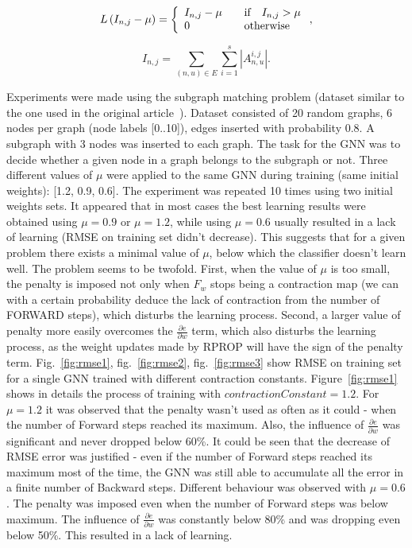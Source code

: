 \documentclass[a4paper, 11pt, twocolumn]{spie}  %
\begin{document}
\begin{equation}
L\left(I_{n,j} - \mu\right) = \left\{
	\begin{array}{l l}
		I_{n,j} - \mu & \quad \text{if} \quad I_{n,j} > \mu \\
		0 & \quad \text{otherwise}
	\end{array} \right. ,
\label{eq:contraction}
\end{equation}

\begin{equation}
I_{n,j} = \sum_{(n, u) \in E} \sum_{i=1}^{s}|A_{n,u}^{i,j}|.
\end{equation}

Experiments were made using the subgraph matching problem (dataset similar to the one used in the original article~\cite{scarselli2009graph}). Dataset consisted of 20 random graphs, 6 nodes per graph (node labels [0..10]), edges inserted with probability 0.8. A subgraph with 3 nodes was inserted to each graph. The task for the GNN was to decide whether a given node in a graph belongs to the subgraph or not. Three different values of $\mu$ were applied to the same GNN during training (same initial weights): [1.2, 0.9, 0.6]. The experiment was repeated 10 times using two initial weights sets. It appeared that in most cases the best learning results were obtained using $\mu = 0.9$ or $\mu = 1.2$, while using $\mu = 0.6$ usually resulted in a lack of learning (RMSE on training set didn't decrease). This suggests that for a given problem there exists a minimal value of $\mu$, below which the classifier doesn't learn well. The problem seems to be twofold. First, when the value of $\mu$ is too small, the penalty is imposed not only when $F_w$ stops being a contraction map (we can with a certain probability deduce the lack of contraction from the number of FORWARD steps), which disturbs the learning process. Second, a larger value of penalty more easily overcomes the $\frac{\partial e}{\partial w}$ term, which also disturbs the learning process, as the weight updates made by RPROP will have the sign of the penalty term. Fig.~\ref{fig:rmse1}, fig.~\ref{fig:rmse2}, fig.~\ref{fig:rmse3} show RMSE on training set for a single GNN trained with different contraction constants. Figure~\ref{fig:rmse1} shows in details the process of training with $contractionConstant = 1.2$. For $\mu = 1.2$ it was observed that the penalty wasn't used as often as it could - when the number of Forward steps reached its maximum. Also, the influence of $\frac{\partial e}{\partial w}$ was significant and never dropped below 60\%. It could be seen that the decrease of RMSE error was justified - even if the number of Forward steps reached its maximum most of the time, the GNN was still able to accumulate all the error in a finite number of Backward steps. Different behaviour was observed with $\mu = 0.6$. The penalty was imposed even when the number of Forward steps was below maximum. The influence of $\frac{\partial e}{\partial w}$ was constantly below 80\% and was dropping even below 50\%. This resulted in a lack of learning.
\end{document}
